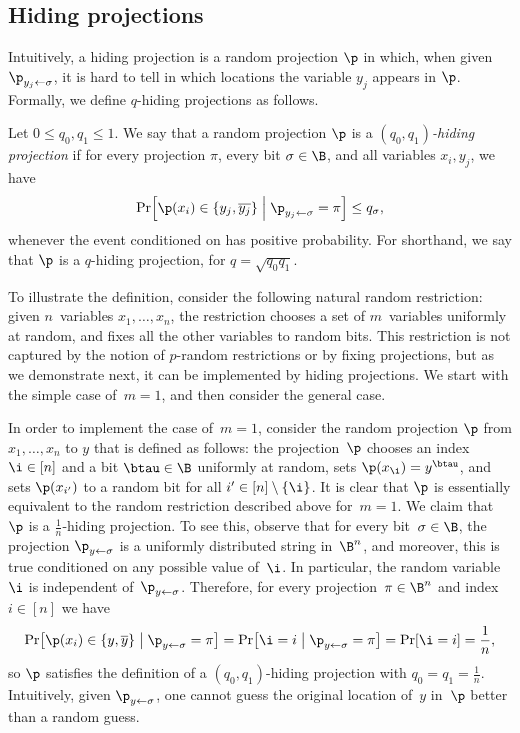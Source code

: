 \subsection{\label{subsec:Hiding-projections}Hiding projections}

Intuitively, a hiding projection is a random projection $\p$ in which,
when given $\p_{y_{j}\gets\sigma}$, it is hard to tell in which locations
the variable $y_{j}$ appears in $\p$. Formally, we define $q$-hiding
projections as follows. 
\begin{definition}
\label{def:hiding-projections}Let $0\leq q_{0},q_{1}\leq1$. We say that
a random projection $\p$ is a \emph{$(q_{0},q_{1})$-hiding projection}
if for every projection $\pi$, every bit $\sigma\in\B$, and all
variables $x_{i},y_{j}$, we have 
\[
\Pr\!\left[\p(x_{i})\in\left\{ y_{j},\overline{y_{j}}\right\} \;\middle|\;\p_{y_{j}\gets\sigma}=\pi\right]\leq q_{\sigma},
\]
whenever the event conditioned on has positive probability. For shorthand,
we say that $\p$ is a $q$-hiding projection, for $q=\sqrt{q_{0}q_{1}}$. 
\end{definition}

\noindent To illustrate the definition, consider the following natural
random restriction: given $n$~variables $x_{1},\ldots,x_{n}$, the
restriction chooses a set of $m$~variables uniformly at random,
and fixes all the other variables to random bits. This restriction
is not captured by the notion of $p$-random restrictions or by fixing
projections, but as we demonstrate next, it can be implemented by
hiding projections. We start with the simple case of~$m=1$, and
then consider the general case. 
\begin{example}
\label{ex:random-edge}In order to implement the case of~$m=1$, consider
the random projection $\p$ from $x_{1},\ldots,x_{n}$ to $y$ that
is defined as follows: the projection~$\p$ chooses an index~$\i\in\left[n\right]$
and a bit $\btau\in\B$ uniformly at random, sets $\p(x_{\i})=y^{\btau}$,
and sets $\p(x_{i'})$ to a random bit for all $i'\in\left[n\right]\setminus\left\{ \i\right\} $.
It is clear that $\p$ is essentially equivalent to the random restriction
described above for~$m=1$. We claim that $\p$ is a $\frac{1}{n}$-hiding
projection. To see this, observe that for every bit~$\sigma\in\B$,
the projection $\p_{y\gets\sigma}$ is a uniformly distributed string
in~$\B^{n}$, and moreover, this is true conditioned on any possible
value of~$\i$. In particular, the random variable~$\i$ is independent
of~$\p_{y\gets\sigma}$. Therefore, for every projection~$\pi\in\B^{n}$
and index~$i\in\left[n\right]$ we have 
\[
\Pr\!\left[\p(x_{i})\in\left\{ y,\overline{y}\right\} \;\middle|\;\p_{y\gets\sigma}=\pi\right]=\Pr\!\left[\i=i\;\middle|\;\p_{y\gets\sigma}=\pi\right]=\Pr\!\left[\i=i\right]=\frac{1}{n},
\]
so $\p$ satisfies the definition of a $(q_{0},q_{1})$-hiding projection
with $q_{0}=q_{1}=\frac{1}{n}$. Intuitively, given $\p_{y\gets\sigma}$,
one cannot guess the original location of~$y$ in~$\p$ better than
a random guess.
\end{example}


